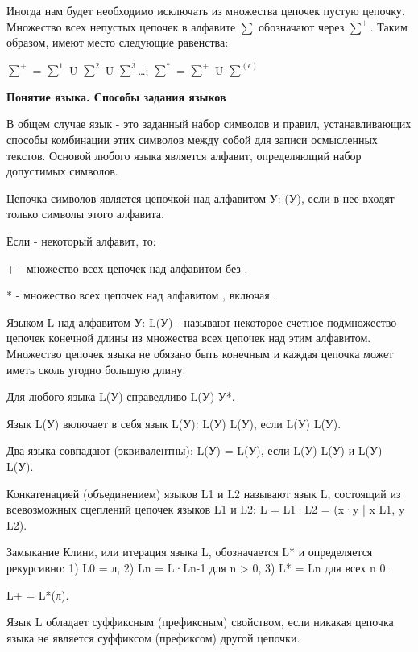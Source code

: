 Иногда нам будет необходимо исключать из множества цепочек пустую цепочку. Множество всех непустых цепочек в алфавите $\sum$ обозначают через $\sum^{+}$. Таким образом, имеют место следующие равенства: 

$\sum^{+}$ = $\sum^{1}$ U $\sum^{2}$ U $\sum^{3}$\dots ;  $\sum^{*}$ = $\sum^{+}$ U $\sum^(\epsilon)$

\begin{center}{\bfseries Понятие языка. Способы задания языков}
\end{center}

\begin{opr}
  В общем случае язык - это заданный набор символов и правил, устанавливающих способы комбинации этих символов между собой для записи осмысленных текстов. Основой любого языка является алфавит, определяющий набор допустимых символов.
\end{opr}
 
Цепочка символов является цепочкой над алфавитом У: (У), если в нее входят только символы этого алфавита.

Если - некоторый алфавит, то:

+ - множество всех цепочек над алфавитом без .

* - множество всех цепочек над алфавитом , включая .

\begin{opr}
  Языком L над алфавитом У: L(У) - называют некоторое счетное подмножество цепочек конечной длины из множества всех цепочек над этим алфавитом. Множество цепочек языка не обязано быть конечным и каждая цепочка может иметь сколь угодно большую длину.
\end{opr}

Для любого языка L(У) справедливо L(У) У*.

Язык L(У) включает в себя язык L(У): L(У) L(У), если L(У) L(У).

Два языка совпадают (эквивалентны): L(У) = L(У), если L(У) L(У) и L(У) L(У).

Конкатенацией (объединением) языков L1 и L2 называют язык L, состоящий из всевозможных сцеплений цепочек языков L1 и L2: L = L1·L2 = (x·y | x L1, y L2).

Замыкание Клини, или итерация языка L, обозначается L* и определяется рекурсивно: 1) L0 = {л}, 2) Ln = L·Ln-1 для n > 0, 3) L* = Ln для всех n 0.

L+ = L*(л).

Язык L обладает суффиксным (префиксным) свойством, если никакая цепочка языка не является суффиксом (префиксом) другой цепочки.

